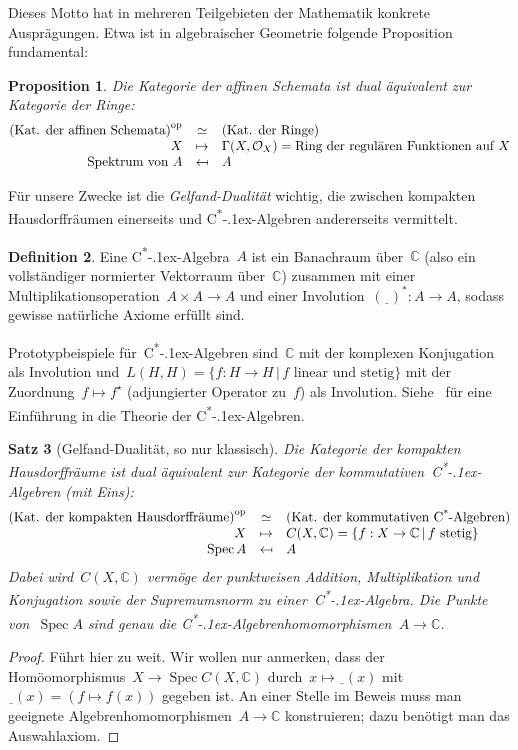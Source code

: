 \documentclass[a4paper,ngerman,12pt]{scrartcl}
\theoremstyle{definition}
\newtheorem{defn}{Definition}[section]
\theoremstyle{plain}
\newtheorem{prop}[defn]{Proposition}
\newtheorem{satz}[defn]{Satz}
\theoremstyle{remark}
\newcommand{\CC}{\mathbb{C}}
\renewcommand{\O}{\mathcal{O}}
\newcommand{\freist}{\underline{\ \ }}
\newcommand{\csalgebra}{C\textsuperscript{*}\kern-.1ex-Algebra}
\newcommand{\csalgebren}{C\textsuperscript{*}\kern-.1ex-Alge\-bren}
\DeclareMathOperator{\Spec}{Spec}
\newcommand{\op}{\mathrm{op}}
\renewcommand{\_}{\mathpunct{.}\,}
\newcommand{\?}{\,{:}\,}
\begin{document}
Dieses Motto hat in mehreren Teilgebieten der Mathematik konkrete Ausprägungen.
Etwa ist in algebraischer Geometrie folgende Proposition fundamental:
\begin{prop}Die Kategorie der affinen Schemata ist dual äquivalent zur Kategorie der
Ringe:
\[ \begin{array}{@{}rcl@{}}
  \textnormal{(Kat. der affinen Schemata)}^\op &\simeq& \textnormal{(Kat. der Ringe)} \\
  X &\mapsto& \Gamma(X, \O_X) = \textnormal{Ring der regulären Funktionen auf~$X$} \\
  \textnormal{Spektrum von~$A$} &\mapsfrom& A
\end{array} \]
\end{prop}

Für unsere Zwecke ist die \emph{Gelfand-Dualität} wichtig, die zwischen
kompakten Hausdorffräumen einerseits und \csalgebren{} andererseits vermittelt.
\begin{defn}Eine \csalgebra~$A$ ist ein Banachraum über~$\CC$ (also ein vollständiger
normierter Vektorraum über~$\CC$) zusammen mit einer
Multiplikationsoperation~$A \times A \to A$ und einer Involution~$(\freist)^* :
A \to A$, sodass gewisse natürliche Axiome erfüllt sind.\end{defn}
Prototypbeispiele für~\csalgebren{} sind~$\CC$ mit der komplexen Konjugation
als Involution und~$L(H,H) = \{ f : H \to H \,|\, \text{$f$ linear und stetig}
\}$ mit der Zuordnung~$f \mapsto f^\star$ (adjungierter Operator
zu~$f$) als Involution. Siehe~\cite{harpe:jones:cstar} für eine Einführung in
die Theorie der \csalgebren.
\begin{satz}[Gelfand-Dualität, so nur klassisch]
Die Kategorie der kompakten Hausdorffräume ist dual äquivalent zur Kategorie
der kommutativen~\csalgebren{} (mit Eins):
\[ \begin{array}{@{}rcl@{}}
  \textnormal{(Kat. der kompakten Hausdorffräume)}^\op &\simeq&
  \textnormal{(Kat. der kommutativen \csalgebren)} \\
  X &\mapsto& C(X, \CC) = \{ f : X \to \CC \,|\, \textnormal{$f$ stetig} \} \\
  \Spec A &\mapsfrom& A
\end{array} \]
Dabei wird~$C(X, \CC)$ vermöge der punktweisen Addition, Multiplikation und
Konjugation sowie der Supremumsnorm zu einer~\csalgebra. Die Punkte von~$\Spec
A$ sind genau die \csalgebren{}homomorphismen~$A \to \CC$.
\end{satz}
\begin{proof}
Führt hier zu weit. Wir wollen nur anmerken, dass der Homöomorphismus~$X \to
\Spec C(X,\CC)$ durch~$x \longmapsto \freist(x)$ mit~$\freist(x) = (f \mapsto
f(x))$ gegeben ist. An einer Stelle im Beweis muss man geeignete
Algebrenhomomorphismen~$A \to \CC$ konstruieren; dazu benötigt man das
Auswahlaxiom.
\end{proof}
\end{document}

